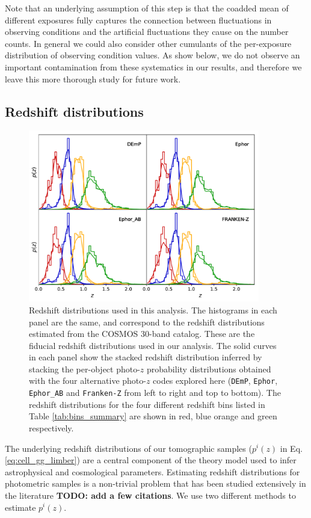 \documentclass[a4paper,11pt]{article}
\newcommand{\todo}[1]{{\bf TODO: #1}}
\begin{document}
    Note that an underlying assumption of this step is that the coadded mean of different exposures fully captures the connection between fluctuations in observing conditions and the artificial fluctuations they cause on the number counts. In general we could also consider other cumulants of the per-exposure distribution of observing condition values. As show below, we do not observe an important contamination from these systematics in our results, and therefore we leave this more thorough study for future work.

  \subsection{Redshift distributions}\label{ssec:methods.nz}
    \begin{figure}
      \centering
      \includegraphics[width=0.9\textwidth]{figures/nzs.pdf}
      \caption{Redshift distributions used in this analysis. The histograms in each panel are the same, and correspond to the redshift distributions estimated from the COSMOS 30-band catalog. These are the fiducial redshift distributions used in our analysis. The solid curves in each panel show the stacked redshift distribution inferred by stacking the per-object photo-$z$ probability distributions obtained with the four alternative photo-$z$ codes explored here ({\tt DEmP}, {\tt Ephor}, {\tt Ephor\_AB} and {\tt Franken-Z} from left to right and top to bottom). The redshift distributions for the four different redshift bins listed in Table \ref{tab:bins_summary} are shown in red, blue orange and green respectively.}
      \label{fig:nzs}
    \end{figure}
    The underlying redshift distributions of our tomographic samples ($p^i(z)$ in Eq. \ref{eq:cell_gg_limber}) are a central component of the theory model used to infer astrophysical and cosmological parameters. Estimating redshift distributions for photometric samples is a non-trivial problem that has been studied extensively in the literature \todo{add a few citations}. We use two different methods to estimate $p^i(z)$.
    
\end{document}
